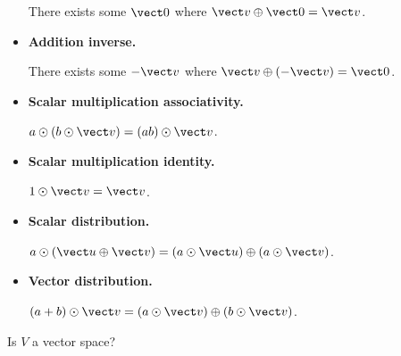 \begin{applicationActivities}{1}{7}
\begin{activity}{25}
\begin{subactivity}
\begin{multicols}{2}
\begin{itemize}
            There exists some \(\vect 0\)
            where \(\vect v\oplus\vect 0=\vect v\).
      \item \textbf{Addition inverse.}

            There exists some \(-\vect v\)
            where \(\vect v\oplus(-\vect v)=\vect 0\).
      \item \textbf{Scalar multiplication associativity.}

            \(a\odot(b\odot\vect v)=(ab)\odot\vect v\).
      \item \textbf{Scalar multiplication identity.}

            \(1\odot\vect v=\vect v\).
      \item \textbf{Scalar distribution.}

            \(a\odot(\vect u\oplus\vect v)=
            (a\odot\vect u)\oplus (a\odot\vect v)\).
      \item \textbf{Vector distribution.}

            \((a+b)\odot\vect v=(a\odot\vect v)\oplus (b\odot\vect v)\).
    \end{itemize}
    \end{multicols}
  \end{subactivity}

  \begin{subactivity}
    Is \(V\) a vector space?
  \end{subactivity}
\end{activity}



\end{applicationActivities}
